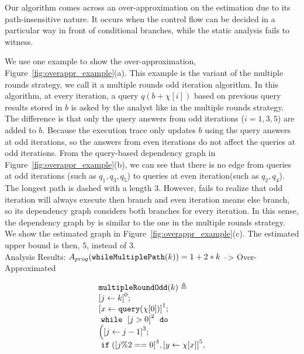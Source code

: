 \begin{example}
Our algorithm comes across an over-approximation on the estimation due to its path-insensitive nature. It occurs when the control flow can be decided in a particular way in front of conditional branches, while the static analysis fails to witness. 

We use one example to show the over-approximation, Figure~\ref{fig:overappr_example}(a). This example is the variant of the multiple rounds strategy, 
we call it a multiple rounds odd iteration algorithm. In this algorithm, at every iteration, a query $q(b+\chi[i])$ based on previous query results stored in $b$ is asked by the analyst like in the multiple rounds strategy. The difference is that only the query answers from odd iterations ($i =1,3, 5$) are added to $b$. 
  Because the execution trace only updates $b$ using the query answers at odd iterations, so the answers from even iterations do not affect the queries at odd iterations. From the query-based dependency graph in Figure~\ref{fig:overappr_example}(b), we can see that there is no edge from queries at odd iterations (such as $q_1,q_3,q_5$) to queries at even iteration(such as $q_2,q_4$). The longest path is dashed with a length $3$.  However, {\THESYSTEM} fails to realize that odd iteration will always execute then branch and even iteration means else branch, so its dependency graph considers both branches for every iteration. In this sense, the dependency graph by {\THESYSTEM} is similar to the one in the multiple rounds strategy. We show the estimated graph in Figure~\ref{fig:overappr_example}(c). The estimated upper bound is then, $5$, instead of $3$. 
%
\\
Analysis Results: $ A_{{prog}}(\mathtt{whileMultiplePath}(k)) = 1 + 2 * k $ --> Over-Approximated
%
{ \small
\begin{figure}
\centering
    \begin{subfigure}{0.3\textwidth}
\centering
\[
    \begin{array}{l}
        \kw{multipleRoundOdd}(k) \triangleq \\
        \clabel{ \assign{j}{k}}^{0} ; \\
        \clabel{ \assign{x}{\query(\chi[0])} }^{1} ; \\
            \ewhile ~ \clabel{j > 0}^{2} ~ \edo ~ \\
            \Big(
             \clabel{\assign{j}{j-1}}^{3} ;\\
             \eif(\clabel{j \% 2 == 0}^{4}, 
             \clabel{\assign{y}{\chi[x]}}^{5}, 

\end{array}\]
\end{subfigure}
\end{figure}}
\end{example}
